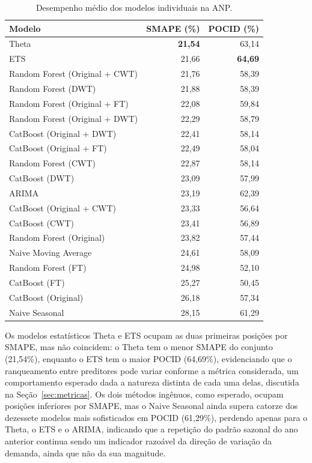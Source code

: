 \begin{table}[H]
\centering
\caption{Desempenho médio dos modelos individuais na ANP.}
\label{tab:anp-individual}
\begin{tabular}{@{}lrr@{}}
\toprule
\textbf{Modelo} & \textbf{SMAPE (\%)} & \textbf{POCID (\%)} \\
\midrule
Theta                                & \textbf{21,54} & 63,14 \\
ETS                                  & 21,66 & \textbf{64,69} \\
Random Forest (Original + CWT)       & 21,76 & 58,39 \\
Random Forest (DWT)                  & 21,88 & 58,39 \\
Random Forest (Original + FT)        & 22,08 & 59,84 \\
Random Forest (Original + DWT)       & 22,29 & 58,79 \\
CatBoost (Original + DWT)            & 22,41 & 58,14 \\
CatBoost (Original + FT)             & 22,49 & 58,04 \\
Random Forest (CWT)                  & 22,87 & 58,14 \\
CatBoost (DWT)                       & 23,09 & 57,99 \\
ARIMA                                & 23,19 & 62,39 \\
CatBoost (Original + CWT)            & 23,33 & 56,64 \\
CatBoost (CWT)                       & 23,41 & 56,89 \\
Random Forest (Original)             & 23,82 & 57,44 \\
Naive Moving Average                 & 24,61 & 58,09 \\
Random Forest (FT)                   & 24,98 & 52,10 \\
CatBoost (FT)                        & 25,27 & 50,45 \\
CatBoost (Original)                  & 26,18 & 57,34 \\
Naive Seasonal                       & 28,15 & 61,29 \\
\bottomrule
\end{tabular}
\end{table}

Os modelos estatísticos Theta e ETS ocupam as duas primeiras posições por SMAPE, mas não coincidem: o Theta tem o menor SMAPE do conjunto (21,54\%), enquanto o ETS tem o maior POCID (64,69\%), evidenciando que o ranqueamento entre preditores pode variar conforme a métrica considerada, um comportamento esperado dada a natureza distinta de cada uma delas, discutida na Seção~\ref{sec:metricas}. Os dois métodos ingênuos, como esperado, ocupam posições inferiores por SMAPE, mas o Naive Seasonal ainda supera catorze dos dezessete modelos mais sofisticados em POCID (61,29\%), perdendo apenas para o Theta, o ETS e o ARIMA, indicando que a repetição do padrão sazonal do ano anterior continua sendo um indicador razoável da direção de variação da demanda, ainda que não da sua magnitude.

